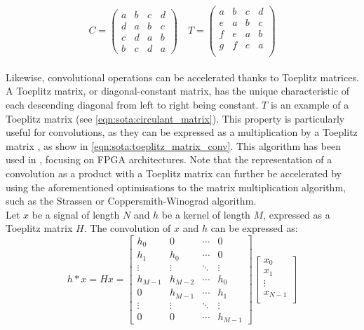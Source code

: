 \begin{equation}
  \label{eqn:sota:circulant_matrix}
  C =
  \begin{pmatrix}
    a & b & c & d \\
    d & a & b & c \\
    c & d & a & b \\
    b & c & d & a
  \end{pmatrix}
  \quad
  T =
  \begin{pmatrix}
    a & b & c & d \\
    e & a & b & c \\
    f & e & a & b \\
    g & f & e & a \\
  \end{pmatrix}
\end{equation}\\

Likewise, convolutional operations can be accelerated thanks to Toeplitz
matrices. A Toeplitz matrix, or diagonal-constant matrix, has the unique
characteristic of each descending diagonal from left to right being constant.
$T$ is an example of a Toeplitz matrix (see \cref{eqn:sota:circulant_matrix}).
This property is particularly useful for convolutions, as they can be expressed
as a multiplication by a Toeplitz matrix \cite{gray2006toeplitz}, as show in
\cref{eqn:sota:toeplitz_matrix_conv}. This algorithm has been used in
\cite{liao2019compressing}, focusing on \ac{FPGA} architectures. Note that the
representation of a convolution as a product with a Toeplitz matrix can further
be accelerated by using the aforementioned optimisations to the matrix
multiplication algorithm, such as the Strassen or Coppersmith-Winograd
algorithm.\\


Let $x$ be a signal of length $N$ and $h$ be a kernel of length $M$, expressed
as a Toeplitz matrix $H$. The convolution of $x$ and $h$ can be expressed as:\\

\begin{equation}
  \label{eqn:sota:toeplitz_matrix_conv}
  h * x = Hx = \begin{bmatrix}
    h_0     & 0       & \cdots & 0       \\
    h_1     & h_0     & \cdots & 0       \\
    \vdots  & \vdots  & \ddots & \vdots  \\
    h_{M-1} & h_{M-2} & \cdots & h_0     \\
    0       & h_{M-1} & \cdots & h_1     \\
    \vdots  & \vdots  & \ddots & \vdots  \\
    0       & 0       & \cdots & h_{M-1}
  \end{bmatrix}
  \begin{bmatrix}
    x_0     \\
    x_1     \\
    \vdots  \\
    x_{N-1} \\
  \end{bmatrix}
\end{equation}\\

